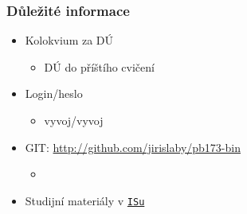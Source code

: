 


\newcommand{\ant}{\textsc{Antlr}\xspace}

\subtitle{II. Parsery}
\date{27. 9. \the\year}



\begin{frame}
  \titlepage
\end{frame}


\begin{frame}
  \frametitle{Důležité informace}

  \begin{itemize}

  \item Kolokvium za DÚ
  \begin{itemize}
  \item DÚ do příštího cvičení
  \end{itemize}

  \item Login/heslo
  \begin{itemize}
  \item vyvoj/vyvoj
  \end{itemize}

  \item GIT: \url{http://github.com/jirislaby/pb173-bin}
  \begin{itemize}
  \item {}
  \end{itemize}

  \item Studijní materiály v \href{https://is.muni.cz/auth/el/1433/podzim2015/PB173/index.qwarp}{\nolinkurl{ISu}}

  \end{itemize}
\end{frame}




